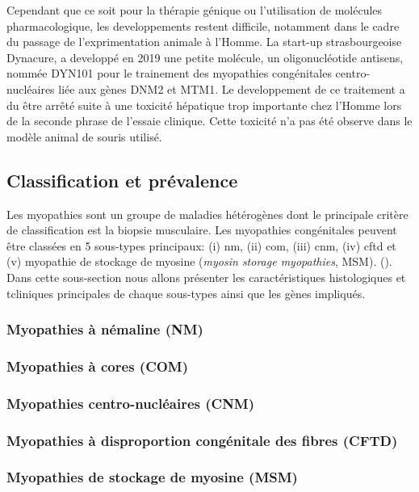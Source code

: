 Cependant que ce soit pour la thérapie génique ou l'utilisation de molécules pharmacologique, les developpements restent difficile, notamment dans le cadre du passage de l'exprimentation animale à l'Homme. La start-up strasbourgeoise Dynacure, a developpé en 2019 une petite molécule, un oligonucléotide antisens, nommée DYN101 pour le trainement des myopathies congénitales centro-nucléaires liée aux gènes DNM2 et MTM1. Le developpement de ce traitement a du être arrêté suite à une toxicité hépatique trop importante chez l'Homme lors de la seconde phrase de l'essaie clinique. Cette toxicité n'a pas été observe dans le modèle animal de souris utilisé.

\subsection{Classification et prévalence}
Les myopathies sont un groupe de maladies hétérogènes dont le principale critère de classification est la biopsie musculaire. Les myopathies congénitales peuvent être classées en 5 sous-types principaux: (i) \gls{nm}, (ii) \gls{com}, (iii) \gls{cnm}, (iv) \gls{cftd} et (v) myopathie de stockage de myosine (\textit{myosin storage myopathies}, MSM). (\cite{cassandrini_congenital_2017, claeys_congenital_2020, north_approach_2014}). Dans cette sous-section nous allons présenter les caractéristiques histologiques et tcliniques principales de chaque sous-types ainsi que les gènes impliqués. 

\subsubsection{Myopathies à némaline (NM)}


\subsubsection{Myopathies à cores (COM)}


\subsubsection{Myopathies centro-nucléaires (CNM)}


\subsubsection{Myopathies à disproportion congénitale des fibres (CFTD)}


\subsubsection{Myopathies de stockage de myosine (MSM)}


